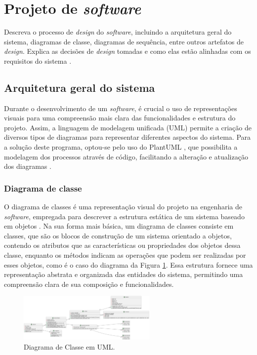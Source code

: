 \section{Projeto de \textit{software}}

Descreva o processo de \textit{design} do \textit{software}, incluindo a arquitetura geral do sistema, diagramas de classe, diagramas de sequência, entre outros artefatos de \textit{design}. Explica as decisões de \textit{design} tomadas e como elas estão alinhadas com os requisitos do sistema \cite{softwareeng}.

\subsection{Arquitetura geral do sistema}

Durante o desenvolvimento de um \textit{software}, é crucial o uso de representações visuais para uma compreensão mais clara das funcionalidades e estrutura do projeto. Assim, a linguagem de modelagem unificada (UML) permite a criação de diversos tipos de diagramas para representar diferentes aspectos do sistema. Para a solução deste programa, optou-se pelo uso do PlantUML \cite{plantumldoc}, que possibilita a modelagem dos processos através de código, facilitando a alteração e atualização dos diagramas \cite{softwareengreq}.

\subsubsection{Diagrama de classe}

O diagrama de classes é uma representação visual do projeto na engenharia de \textit{software}, empregada para descrever a estrutura estática de um sistema baseado em objetos \cite{softwareenguml}. Na sua forma mais básica, um diagrama de classes consiste em classes, que são os blocos de construção de um sistema orientado a objetos, contendo os atributos que as características ou propriedades dos objetos dessa classe, enquanto os métodos indicam as operações que podem ser realizadas por esses objetos, como é o caso do diagrama da Figura \ref{fig:ClassDiagram}. Essa estrutura fornece uma representação abstrata e organizada das entidades do sistema, permitindo uma compreensão clara de sua composição e funcionalidades.
            
\begin{figure}[htb]
    \caption{\label{fig:ClassDiagram}Diagrama de Classe em UML.}
    \begin{center}
        \includegraphics[width=0.6\textwidth]{figuras/ClassDiagram.png}
    \end{center}
\end{figure}
            
